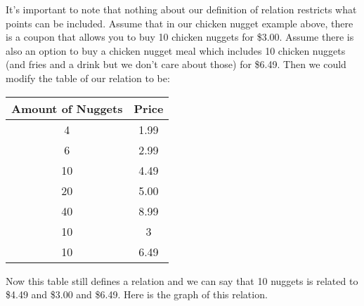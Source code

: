 \documentclass{ximera}
\begin{document}
\begin{example}
It's important to note that nothing about our definition of relation restricts what points can be included.  Assume that in our chicken nugget example above, there is a coupon that allows you to buy 10 chicken nuggets for \$3.00.  Assume there is also an option to buy a chicken nugget meal which includes 10 chicken nuggets (and fries and a drink but we don't care about those) for \$6.49.  Then we could modify the table of our relation to be:
\begin{center}
 \begin{tabular}{||c c||} 
 \hline
 Amount of Nuggets & Price \\ [0.5ex] 
 \hline\hline
 4 & 1.99\\ 
 \hline
 6 & 2.99 \\
 \hline
 10 & 4.49\\
 \hline
 20 & 5.00 \\
 \hline
 40 & 8.99\\ 
 \hline
 10 & 3 \\
 \hline
 10 & 6.49\\ [1ex] 
 \hline
\end{tabular}
\end{center}

Now this table still defines a relation and we can say that 10 nuggets is related to \$4.49 and \$3.00 and \$6.49. Here is the graph of this relation.


\end{example}
\end{document}
